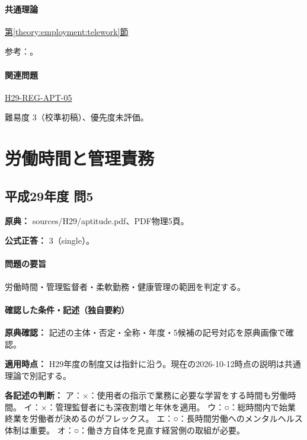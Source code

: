 \paragraph{共通理論} \hyperref[theory:employment:telework]{第\ref*{theory:employment:telework}節}

\par 参考：\cite{employment_telework2020,employment_telework_current}。

\paragraph{関連問題} \hyperref[q:h29-reg-apt-05]{H29-REG-APT-05}

\par 難易度 3（校準初稿）、優先度未評価。

\section{労働時間と管理責務}

\subsection{平成29年度 問5}
\label{q:h29-reg-apt-05}

\noindent\textbf{原典：} sources/H29/aptitude.pdf、PDF物理5頁。

\textbf{公式正答：} 3（single）。

\paragraph{問題の要旨} 労働時間・管理監督者・柔軟勤務・健康管理の範囲を判定する。

\paragraph{確認した条件・記述（独自要約）}\mbox{}\par

\noindent\textbf{原典確認：} 記述の主体・否定・全称・年度・5候補の記号対応を原典画像で確認。\par

\noindent\textbf{適用時点：} H29年度の制度又は指針に沿う。現在の2026-10-12時点の説明は共通理論で別記する。\par

\noindent\textbf{各記述の判断：} ア：×：使用者の指示で業務に必要な学習をする時間も労働時間。 イ：×：管理監督者にも深夜割増と年休を適用。 ウ：○：総時間内で始業終業を労働者が決めるのがフレックス。 エ：○：長時間労働へのメンタルヘルス体制は重要。 オ：○：働き方自体を見直す経営側の取組が必要。\par

